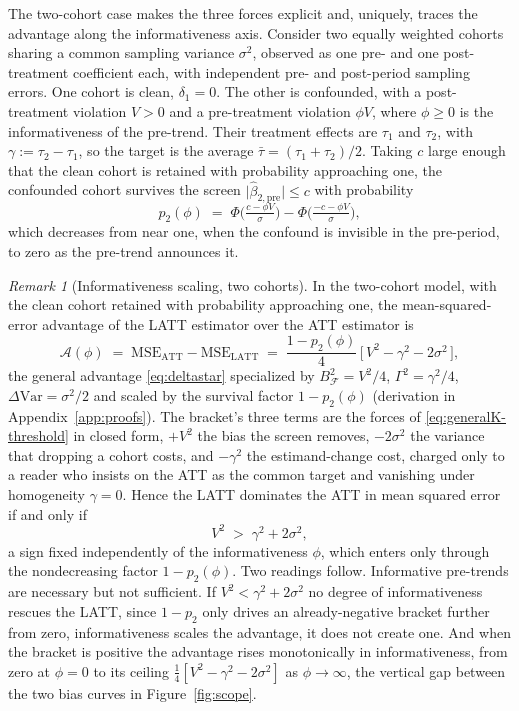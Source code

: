 \documentclass[12pt]{article}
\theoremstyle{remark}
\newtheorem{remark}{Remark}
\begin{document}
The two-cohort case makes the three forces explicit and, uniquely, traces the advantage along the
informativeness axis. Consider two equally weighted cohorts sharing a common sampling variance
$\sigma^2$, observed as one pre- and one post-treatment coefficient each, with independent pre- and
post-period sampling errors. One cohort is clean, $\delta_1=0$. The other is confounded, with a
post-treatment violation $V>0$ and a pre-treatment violation $\phi V$, where $\phi\ge0$ is the
informativeness of the pre-trend. Their treatment effects are $\tau_1$ and $\tau_2$, with
$\gamma:=\tau_2-\tau_1$, so the target is the average $\bar\tau=(\tau_1+\tau_2)/2$. Taking $c$ large
enough that the clean cohort is retained with probability approaching one, the confounded cohort
survives the screen $\lvert\hat\beta_{2,\mathrm{pre}}\rvert\le c$ with probability
\begin{equation}\label{eq:p2}
p_2(\phi)\;=\;\Phi\!\Big(\tfrac{c-\phi V}{\sigma}\Big)-\Phi\!\Big(\tfrac{-c-\phi V}{\sigma}\Big),
\end{equation}
which decreases from near one, when the confound is invisible in the pre-period, to zero as the
pre-trend announces it.

\begin{remark}[Informativeness scaling, two cohorts]\label{rem:inform}
In the two-cohort model, with the clean cohort retained with probability approaching one, the
mean-squared-error advantage of the LATT estimator over the ATT estimator is
\begin{equation}\label{eq:delta}
\mathcal{A}(\phi)\;=\;\mathrm{MSE}_{\mathrm{ATT}}-\mathrm{MSE}_{\mathrm{LATT}}
\;=\;\frac{1-p_2(\phi)}{4}\,\big[\,V^2-\gamma^2-2\sigma^2\,\big],
\end{equation}
the general advantage \eqref{eq:deltastar} specialized by $B_{\mathcal F}^2=V^2/4$, $\Gamma^2=\gamma^2/4$,
$\Delta\mathrm{Var}=\sigma^2/2$ and scaled by the survival factor $1-p_2(\phi)$ (derivation in
Appendix~\ref{app:proofs}). The bracket's three terms are the forces of \eqref{eq:generalK-threshold} in
closed form, $+V^2$ the bias the screen removes, $-2\sigma^2$ the variance that dropping a cohort costs,
and $-\gamma^2$ the estimand-change cost, charged only to a reader who insists on the ATT as the common
target and vanishing under homogeneity $\gamma=0$. Hence the LATT dominates the ATT in mean squared error
if and only if
\begin{equation}\label{eq:threshold}
V^2\;>\;\gamma^2+2\sigma^2 ,
\end{equation}
a sign fixed independently of the informativeness $\phi$, which enters only through the nondecreasing
factor $1-p_2(\phi)$. Two readings follow. Informative pre-trends are necessary but not sufficient. If
$V^2<\gamma^2+2\sigma^2$ no degree of informativeness rescues the LATT, since $1-p_2$ only drives an
already-negative bracket further from zero, informativeness scales the advantage, it does not create one.
And when the bracket is positive the advantage rises monotonically in informativeness, from zero at
$\phi=0$ to its ceiling $\tfrac14[V^2-\gamma^2-2\sigma^2]$ as $\phi\to\infty$, the vertical gap between the
two bias curves in Figure~\ref{fig:scope}.
\end{remark}
\end{document}
